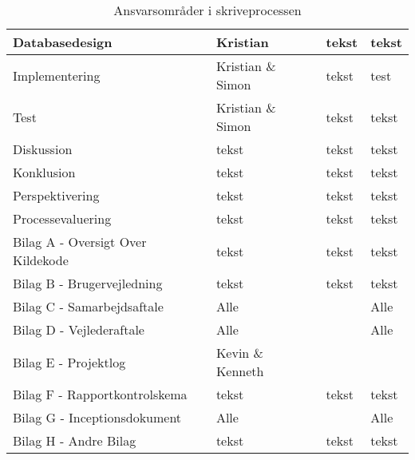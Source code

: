 \begin{table}[H]
\begin{tabularx}{\textwidth}{|p{7cm}|X|X|X|}
        \hline
        Databasedesign                      & Kristian & tekst & tekst \\
        \hline
        Implementering                      & Kristian \& Simon & tekst & test \\
        \hline
        Test                                & Kristian \& Simon & tekst & tekst \\
        \hline
        Diskussion                          & tekst & tekst & tekst \\
        \hline
        Konklusion                          & tekst & tekst & tekst \\
        \hline
        Perspektivering                     & tekst & tekst & tekst \\
        \hline
        Processevaluering                   & tekst & tekst & tekst \\
        \hline
        Bilag A - Oversigt Over Kildekode   & tekst & tekst & tekst \\
        \hline
        Bilag B - Brugervejledning          & tekst & tekst & tekst\\
        \hline
        Bilag C - Samarbejdsaftale          & Alle &  & Alle\\
        \hline
        Bilag D - Vejlederaftale            & Alle &  & Alle\\
        \hline
        Bilag E - Projektlog                & Kevin \& Kenneth &  & \\
        \hline
        Bilag F - Rapportkontrolskema       & tekst & tekst & tekst\\
        \hline
        Bilag G - Inceptionsdokument        & Alle &  & Alle \\
        \hline
        Bilag H - Andre Bilag & tekst       & tekst & tekst \\
        \hline
    \end{tabularx}
    \caption{Ansvarsområder i skriveprocessen}
    \label{tab:redaktionelt}
\end{table}